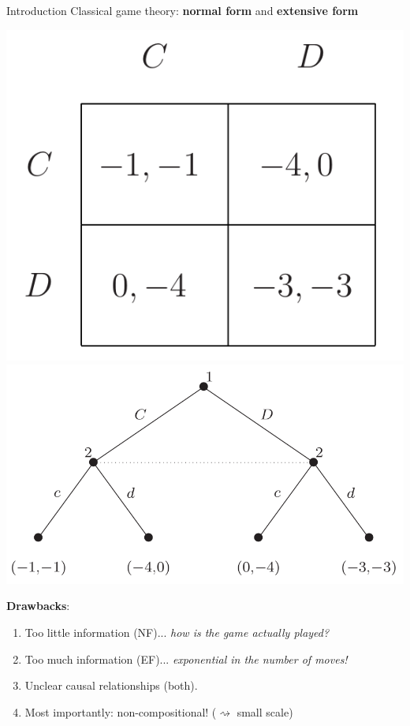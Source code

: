 \begin{frame}{Introduction}
	\vfill
	Classical game theory: \textbf{normal form} and \textbf{extensive form}

	\begin{center}
		\includegraphics[width=.34\textwidth]{figures/pd_norm.png}
		\includegraphics[width=.5\textwidth]{figures/pd_ext.png}
	\end{center}

	\textbf{Drawbacks}:
	\begin{enumerate}
		\item Too little information (NF)... \emph{how is the game actually played?}
		\item Too much information (EF)... \emph{exponential in the number of moves!}
		\item Unclear causal relationships (both).
		\item Most importantly: non-compositional! (\textcolor{coloraccent}{$\rightsquigarrow$ small scale})
	\end{enumerate}
\end{frame}


